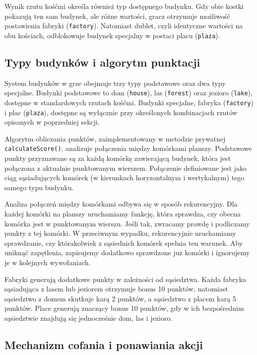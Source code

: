\documentclass[12pt, a4paper]{article}
\begin{document}
Wynik rzutu kośćmi określa również typ dostępnego budynku. Gdy obie kostki pokazują ten sam budynek, ale różne wartości, gracz otrzymuje możliwość postawienia fabryki (\texttt{factory}). Natomiast dublet, czyli identyczne wartości na obu kościach, odblokowuje budynek specjalny w postaci placu (\texttt{plaza}).

\subsection{Typy budynków i algorytm punktacji}

System budynków w grze obejmuje trzy typy podstawowe oraz dwa typy specjalne. Budynki podstawowe to dom (\texttt{house}), las (\texttt{forest}) oraz jezioro (\texttt{lake}), dostępne w standardowych rzutach kośćmi. Budynki specjalne, fabryka (\texttt{factory}) i plac (\texttt{plaza}), dostępne są wyłącznie przy określonych kombinacjach rzutów opisanych w poprzedniej sekcji.

Algorytm obliczania punktów, zaimplementowany w metodzie prywatnej \texttt{calculateScore()}, analizuje połączenia między komórkami planszy. Podstawowe punkty przyznawane są za każdą komórkę zawierającą budynek, która jest połączona z aktualnie punktowanym wierszem. Połączenie definiowane jest jako ciąg sąsiadujących komórek (w kierunkach horyzontalnym i wertykalnym) tego samego typu budynku.

Analiza połączeń między komórkami odbywa się w sposób rekurencyjny. Dla każdej komórki na planszy uruchamiamy funkcję, która sprawdza, czy obecna komórka jest w punktowanym wierszu. Jeśli tak, zwracamy prawdę i podliczamy punkty z tej komórki. W przeciwnym wypadku, rekurencyjnie uruchamiamy sprawdzanie, czy którakolwiek z sąsiednich komórek spełnia ten warunek. Aby uniknąć zapętlenia, zapisujemy dodatkowo sprawdzone już komórki i ignorujemy je w kolejnych wywołaniach.

Fabryki generują dodatkowe punkty w zależności od sąsiedztwa. Każda fabryka sąsiadująca z lasem lub jeziorem otrzymuje bonus 10 punktów, natomiast sąsiedztwo z domem skutkuje karą 2 punktów, a sąsiedztwo z placem karą 5 punktów. Place generują znaczący bonus 10 punktów, gdy w ich bezpośrednim sąsiedztwie znajdują się jednocześnie dom, las i jezioro.

\subsection{Mechanizm cofania i ponawiania akcji}
\end{document}
